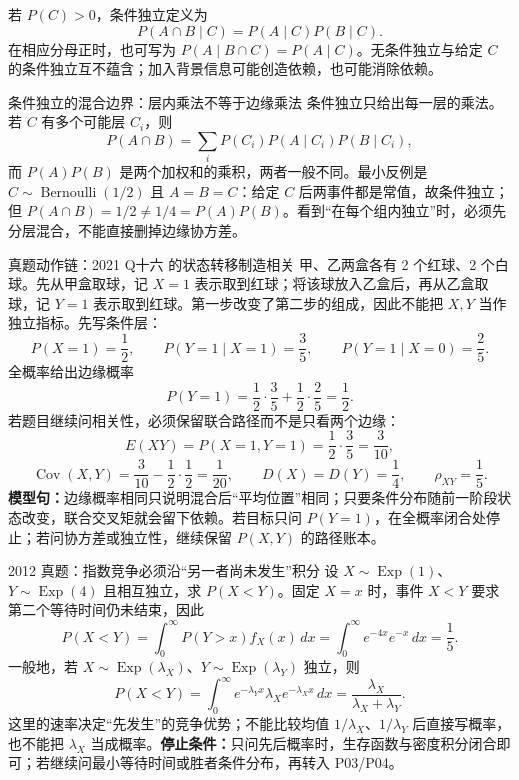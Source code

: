 \documentclass[11pt,a4paper]{ctexart}
\newcommand{\kw}[1]{\textbf{\color{deep}#1}}
\begin{document}
若 $P(C)>0$，条件独立定义为
\[
\boxed{P(A\cap B\mid C)=P(A\mid C)P(B\mid C)}.
\]
在相应分母正时，也可写为 $P(A\mid B\cap C)=P(A\mid C)$。无条件独立与给定 $C$ 的条件独立互不蕴含；加入背景信息可能创造依赖，也可能消除依赖。

\begin{methodbox}{条件独立的混合边界：层内乘法不等于边缘乘法}
条件独立只给出每一层的乘法。若 $C$ 有多个可能层 $C_i$，则
\[
P(A\cap B)=\sum_iP(C_i)P(A\mid C_i)P(B\mid C_i),
\]
而 $P(A)P(B)$ 是两个加权和的乘积，两者一般不同。最小反例是 $C\sim\operatorname{Bernoulli}(1/2)$ 且 $A=B=C$：给定 $C$ 后两事件都是常值，故条件独立；但 $P(A\cap B)=1/2\ne1/4=P(A)P(B)$。看到“在每个组内独立”时，必须先分层混合，不能直接删掉边缘协方差。
\end{methodbox}

\begin{examplebox}{真题动作链：2021 Q十六 的状态转移制造相关}
甲、乙两盒各有 2 个红球、2 个白球。先从甲盒取球，记
$X=1$ 表示取到红球；将该球放入乙盒后，再从乙盒取球，记
$Y=1$ 表示取到红球。第一步改变了第二步的组成，因此不能把
$X,Y$ 当作独立指标。先写条件层：
\[
P(X=1)=\frac12,\qquad
P(Y=1\mid X=1)=\frac35,\qquad
P(Y=1\mid X=0)=\frac25.
\]
全概率给出边缘概率
\[
P(Y=1)=\frac12\cdot\frac35+\frac12\cdot\frac25=\frac12.
\]
若题目继续问相关性，必须保留联合路径而不是只看两个边缘：
\[
E(XY)=P(X=1,Y=1)=\frac12\cdot\frac35=\frac3{10},
\]
\[
\operatorname{Cov}(X,Y)=\frac3{10}-\frac12\cdot\frac12=\frac1{20},
\qquad
D(X)=D(Y)=\frac14,
\qquad \rho_{XY}=\frac15.
\]
\kw{模型句：}边缘概率相同只说明混合后“平均位置”相同；只要条件分布随前一阶段状态改变，联合交叉矩就会留下依赖。若目标只问 $P(Y=1)$，在全概率闭合处停止；若问协方差或独立性，继续保留 $P(X,Y)$ 的路径账本。
\end{examplebox}

\begin{examplebox}{2012 真题：指数竞争必须沿“另一者尚未发生”积分}
设 $X\sim\operatorname{Exp}(1)$、$Y\sim\operatorname{Exp}(4)$ 且相互独立，求 $P(X<Y)$。固定 $X=x$ 时，事件 $X<Y$ 要求第二个等待时间仍未结束，因此
\[
P(X<Y)=\int_0^\infty P(Y>x)f_X(x)\,dx
 =\int_0^\infty e^{-4x}e^{-x}\,dx=\frac15.
\]
一般地，若 $X\sim\operatorname{Exp}(\lambda_X)$、$Y\sim\operatorname{Exp}(\lambda_Y)$ 独立，则
\[
P(X<Y)=\int_0^\infty e^{-\lambda_Yx}\lambda_Xe^{-\lambda_Xx}\,dx
 =\frac{\lambda_X}{\lambda_X+\lambda_Y}.
\]
这里的速率决定“先发生”的竞争优势；不能比较均值 $1/\lambda_X$、$1/\lambda_Y$ 后直接写概率，也不能把 $\lambda_X$ 当成概率。\textbf{停止条件：}只问先后概率时，生存函数与密度积分闭合即可；若继续问最小等待时间或胜者条件分布，再转入 P03/P04。
\end{examplebox}
\end{document}
